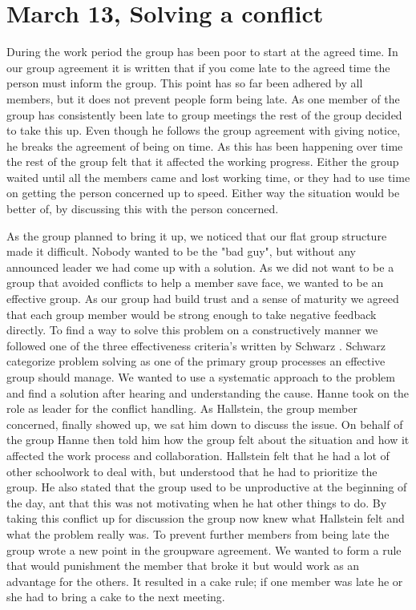 \section{March 13, Solving a conflict}


During the work period the group has been poor to start at the agreed time. In our group agreement it is written that if you come late to the agreed time the person must inform the group. This point has so far been adhered by all members, but it does not prevent people form being late. As one member of the group has consistently been late to group meetings the rest of the group decided to take this up. Even though he follows the group agreement with giving notice, he breaks the agreement of being on time. As this has been happening over time the rest of the group felt that it affected the working progress. Either the group waited until all the members came and lost working time, or they had to use time on getting the person concerned up to speed. Either way the situation would be better of, by discussing this with the person concerned.

As the group planned to bring it up, we noticed that our flat group structure made it difficult. Nobody wanted to be the "bad guy", but without any announced leader we had come up with a solution. As we did not want to be a group that avoided conflicts to help a member save face, we wanted to be an effective group. As our group had build trust and a sense of maturity we agreed that each group member would be strong enough to take negative feedback directly. To find a way to solve this problem on a constructively manner we followed one of the three effectiveness criteria’s written by Schwarz \cite{WorkGroups}. Schwarz \cite{WorkGroups} categorize problem solving as one of the primary group processes an effective group should manage. We wanted to use a systematic approach to the problem and find a solution after hearing and understanding the cause. Hanne took on the role as leader for the conflict handling. As Hallstein, the group member concerned, finally showed up, we sat him down to discuss the issue. On behalf of the group Hanne then told him how the group felt about the situation and how it affected the work process and collaboration. Hallstein felt that he had a lot of other schoolwork to deal with, but understood that he had to prioritize the group. He also stated that the group used to be unproductive at the beginning of the day, ant that this was not motivating when he hat other things to do. By taking this conflict up for discussion the group now knew what Hallstein felt and what the problem really was. To prevent further members from being late the group wrote a new point in the groupware agreement. We wanted to form a rule that would punishment the member that broke it but would work as an advantage for the others. It resulted in a cake rule; if one member was late he or she had to bring a cake to the next meeting. 


